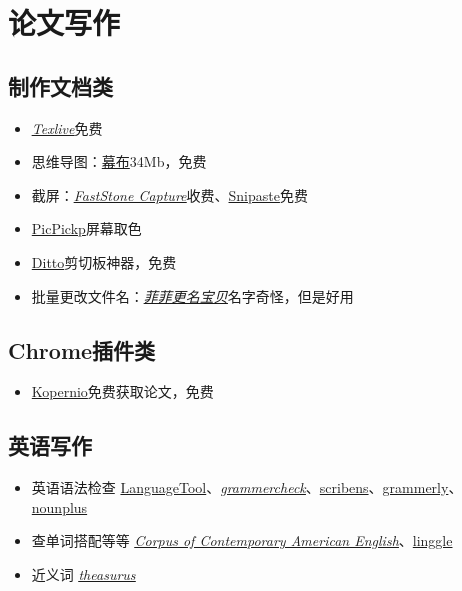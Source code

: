 \documentclass[UTF8]{ctexbook}
\begin{document}
\section{论文写作}
\subsection{制作文档类}
\begin{itemize}
	\item \underline{\textit{\href{https://mirrors.tuna.tsinghua.edu.cn/CTAN/systems/texlive/Images/}{Texlive}}}\quad 免费
	\item 思维导图：\href{https://mubu.com}{幕布}\quad 34Mb，免费
	\item 截屏：\underline{\textit{\href{http://www.faststone.org/FSCaptureDetail.htm}{FastStone Capture}}}\quad 收费、\href{https://www.snipaste.com}{Snipaste}\quad 免费
	\item \href{https://picpick.app/zh/}{PicPickp}\quad 屏幕取色
	\item \href{https://ditto-cp.sourceforge.io}{Ditto}\quad 剪切板神器，免费
	\item 批量更改文件名：\underline{\textit{\href{http://www.ffhome.com/works/1406.html}{菲菲更名宝贝}}}\quad 名字奇怪，但是好用
\end{itemize}

\subsection{Chrome插件类}
\begin{itemize}
	\item \href{https://kopernio.com}{Kopernio}\quad 免费获取论文，免费
\end{itemize}

\subsection{英语写作}
\begin{itemize}
	\item 英语语法检查 \href{https://languagetool.org}{LanguageTool}、\underline{\textit{\href{https://www.grammarcheck.net}{grammercheck}}}、\href{https://www.scribens.com}{scribens}、\href{https://www.grammarly.com}{grammerly}、\href{https://www.nounplus.net}{nounplus}
	\item 查单词搭配等等 \underline{\textit{\href{https://www.english-corpora.org/coca/}{ Corpus of Contemporary American English}}}、\href{https://www.lintcode.com}{linggle}
	\item 近义词 \underline{\textit{\href{https://www.thesaurus.com}{theasurus}}}
\end{itemize}
\end{document}
